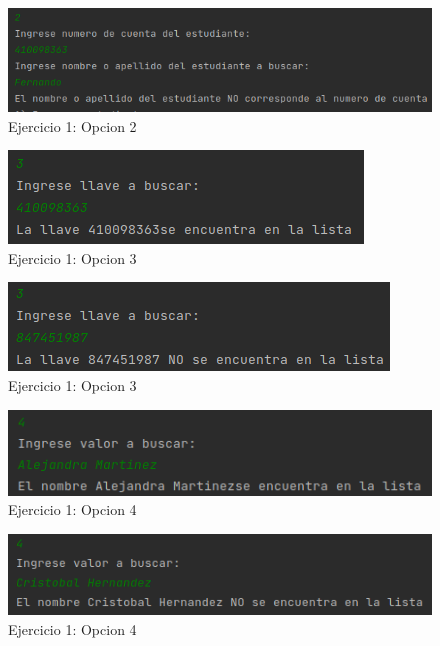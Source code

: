 \documentclass{article}
\begin{document}
			\begin{figure}[H]
				\centering
				\includegraphics[scale=0.6]{images/e14.png}
				\caption*{Ejercicio 1: Opcion 2}
			\end{figure}
			
			\begin{figure}[H]
				\centering
				\includegraphics{images/e15.png}
				\caption*{Ejercicio 1: Opcion 3}
			\end{figure}
			
			\begin{figure}[H]
				\centering
				\includegraphics{images/e16.png}
				\caption*{Ejercicio 1: Opcion 3}
			\end{figure}
			
			\begin{figure}[H]
				\centering
				\includegraphics{images/e17.png}
				\caption*{Ejercicio 1: Opcion 4}
			\end{figure}
			
			\begin{figure}[H]
				\centering
				\includegraphics{images/e18.png}
				\caption*{Ejercicio 1: Opcion 4}
			\end{figure}
			
\end{document}
